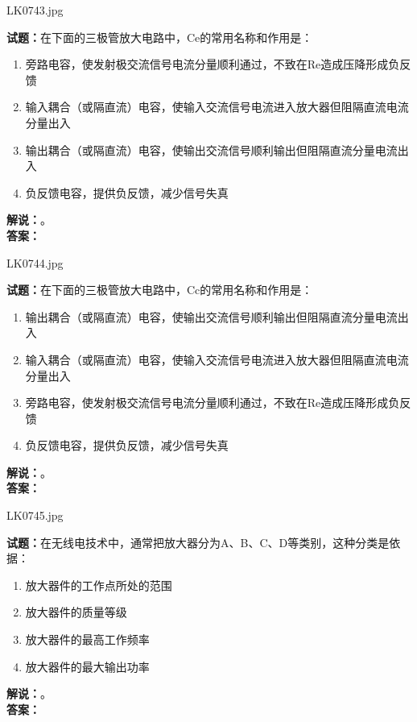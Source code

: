 \documentclass{ctexbook}
\begin{document}
LK0743.jpg

\noindent\textbf{试题：}在下面的三极管放大电路中，Ce的常用名称和作用是：
\begin{enumerate}[leftmargin=3em]
  \item 旁路电容，使发射极交流信号电流分量顺利通过，不致在Re造成压降形成负反馈
  \item 输入耦合（或隔直流）电容，使输入交流信号电流进入放大器但阻隔直流电流分量出入
  \item 输出耦合（或隔直流）电容，使输出交流信号顺利输出但阻隔直流分量电流出入
  \item 负反馈电容，提供负反馈，减少信号失真
\end{enumerate}
\noindent\textbf{解说：}\textbf{}。\\\noindent\textbf{答案：}

\vspace{\baselineskip}

LK0744.jpg

\noindent\textbf{试题：}在下面的三极管放大电路中，Cc的常用名称和作用是：
\begin{enumerate}[leftmargin=3em]
  \item 输出耦合（或隔直流）电容，使输出交流信号顺利输出但阻隔直流分量电流出入
  \item 输入耦合（或隔直流）电容，使输入交流信号电流进入放大器但阻隔直流电流分量出入
  \item 旁路电容，使发射极交流信号电流分量顺利通过，不致在Re造成压降形成负反馈
  \item 负反馈电容，提供负反馈，减少信号失真
\end{enumerate}
\noindent\textbf{解说：}\textbf{}。\\\noindent\textbf{答案：}

\vspace{\baselineskip}

LK0745.jpg

\noindent\textbf{试题：}在无线电技术中，通常把放大器分为A、B、C、D等类别，这种分类是依据：
\begin{enumerate}[leftmargin=3em]
  \item 放大器件的工作点所处的范围
  \item 放大器件的质量等级
  \item 放大器件的最高工作频率
  \item 放大器件的最大输出功率
\end{enumerate}
\noindent\textbf{解说：}\textbf{}。\\\noindent\textbf{答案：}
\end{document}
